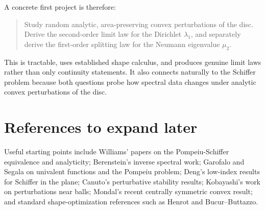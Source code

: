 \documentclass[11pt]{article}
\newcommand{\1}{\mathbf 1}
\begin{document}
A concrete first project is therefore:

\begin{quote}
Study random analytic, area-preserving convex perturbations of the disc. Derive
the second-order limit law for the Dirichlet $\lambda_1$, and separately derive
the first-order splitting law for the Neumann eigenvalue $\mu_2$.
\end{quote}

This is tractable, uses established shape calculus, and produces genuine limit
laws rather than only continuity statements. It also connects naturally to the
Schiffer problem because both questions probe how spectral data changes under
analytic convex perturbations of the disc.

\section*{References to expand later}

Useful starting points include Williams' papers on the Pompeiu-Schiffer
equivalence and analyticity; Berenstein's inverse spectral work; Garofalo and
Segala on univalent functions and the Pompeiu problem; Deng's low-index results
for Schiffer in the plane; Canuto's perturbative stability results; Kobayashi's
work on perturbations near balls; Mondal's recent centrally symmetric convex
result; and standard shape-optimization references such as Henrot and
Bucur--Buttazzo.
\end{document}
